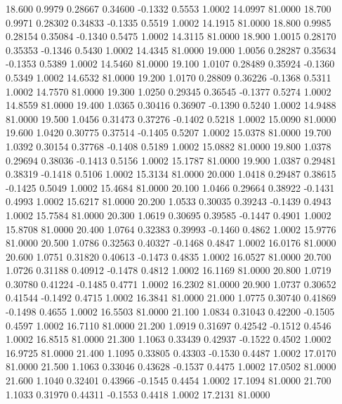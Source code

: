   18.600   0.9979   0.28667   0.34600  -0.1332   0.5553   1.0002  14.0997  81.0000
  18.700   0.9971   0.28302   0.34833  -0.1335   0.5519   1.0002  14.1915  81.0000
  18.800   0.9985   0.28154   0.35084  -0.1340   0.5475   1.0002  14.3115  81.0000
  18.900   1.0015   0.28170   0.35353  -0.1346   0.5430   1.0002  14.4345  81.0000
  19.000   1.0056   0.28287   0.35634  -0.1353   0.5389   1.0002  14.5460  81.0000
  19.100   1.0107   0.28489   0.35924  -0.1360   0.5349   1.0002  14.6532  81.0000
  19.200   1.0170   0.28809   0.36226  -0.1368   0.5311   1.0002  14.7570  81.0000
  19.300   1.0250   0.29345   0.36545  -0.1377   0.5274   1.0002  14.8559  81.0000
  19.400   1.0365   0.30416   0.36907  -0.1390   0.5240   1.0002  14.9488  81.0000
  19.500   1.0456   0.31473   0.37276  -0.1402   0.5218   1.0002  15.0090  81.0000
  19.600   1.0420   0.30775   0.37514  -0.1405   0.5207   1.0002  15.0378  81.0000
  19.700   1.0392   0.30154   0.37768  -0.1408   0.5189   1.0002  15.0882  81.0000
  19.800   1.0378   0.29694   0.38036  -0.1413   0.5156   1.0002  15.1787  81.0000
  19.900   1.0387   0.29481   0.38319  -0.1418   0.5106   1.0002  15.3134  81.0000
  20.000   1.0418   0.29487   0.38615  -0.1425   0.5049   1.0002  15.4684  81.0000
  20.100   1.0466   0.29664   0.38922  -0.1431   0.4993   1.0002  15.6217  81.0000
  20.200   1.0533   0.30035   0.39243  -0.1439   0.4943   1.0002  15.7584  81.0000
  20.300   1.0619   0.30695   0.39585  -0.1447   0.4901   1.0002  15.8708  81.0000
  20.400   1.0764   0.32383   0.39993  -0.1460   0.4862   1.0002  15.9776  81.0000
  20.500   1.0786   0.32563   0.40327  -0.1468   0.4847   1.0002  16.0176  81.0000
  20.600   1.0751   0.31820   0.40613  -0.1473   0.4835   1.0002  16.0527  81.0000
  20.700   1.0726   0.31188   0.40912  -0.1478   0.4812   1.0002  16.1169  81.0000
  20.800   1.0719   0.30780   0.41224  -0.1485   0.4771   1.0002  16.2302  81.0000
  20.900   1.0737   0.30652   0.41544  -0.1492   0.4715   1.0002  16.3841  81.0000
  21.000   1.0775   0.30740   0.41869  -0.1498   0.4655   1.0002  16.5503  81.0000
  21.100   1.0834   0.31043   0.42200  -0.1505   0.4597   1.0002  16.7110  81.0000
  21.200   1.0919   0.31697   0.42542  -0.1512   0.4546   1.0002  16.8515  81.0000
  21.300   1.1063   0.33439   0.42937  -0.1522   0.4502   1.0002  16.9725  81.0000
  21.400   1.1095   0.33805   0.43303  -0.1530   0.4487   1.0002  17.0170  81.0000
  21.500   1.1063   0.33046   0.43628  -0.1537   0.4475   1.0002  17.0502  81.0000
  21.600   1.1040   0.32401   0.43966  -0.1545   0.4454   1.0002  17.1094  81.0000
  21.700   1.1033   0.31970   0.44311  -0.1553   0.4418   1.0002  17.2131  81.0000
